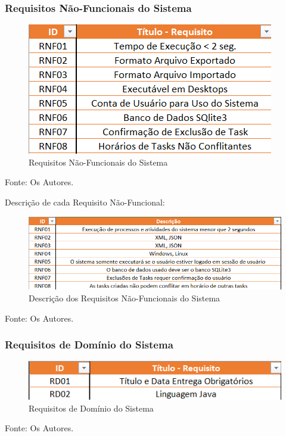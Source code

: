 \documentclass[a4paper,12pt]{article}
\begin{document}
\subsubsection{Requisitos Não-Funcionais do Sistema}
\begin{figure}[H]
	\centering
	\includegraphics[scale=0.80]{requirements/not-functionals/not-functionals.png}
	\caption{Requisitos Não-Funcionais do Sistema}
\end{figure}
\noindent Fonte: Os Autores.


Descrição de cada Requisito Não-Funcional:
\begin{figure}[H]
	\centering
	\includegraphics[scale=0.80]{requirements/not-functionals/description.png}
	\caption{Descrição dos Requisitos Não-Funcionais do Sistema}
\end{figure}
\noindent Fonte: Os Autores.


\subsubsection{Requisitos de Domínio do Sistema}
\begin{figure}[H]
	\centering
	\includegraphics[scale=0.80]{requirements/domain/domain.png}
	\caption{Requisitos de Domínio do Sistema}
\end{figure}
\noindent Fonte: Os Autores.
\end{document}
